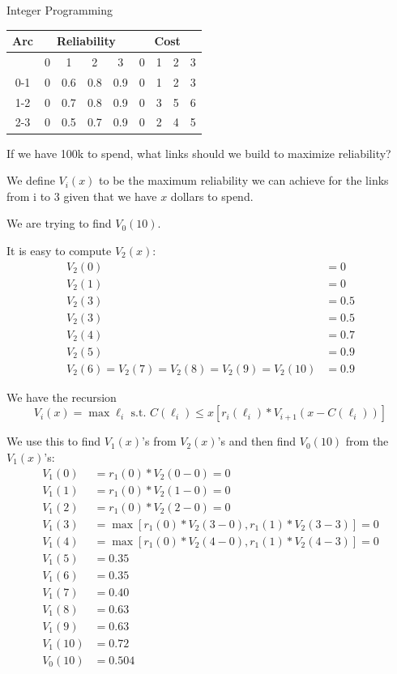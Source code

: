 \documentclass{article}
\begin{document}
\begin{section}{Integer Programming}
\begin{eg}
    \begin{tabular}{c | c | c | c | c | c | c | c | c }
        Arc & \multicolumn{4}{|c}{Reliability} & \multicolumn{4}{|c}{Cost} \\
        \hline
         & 0 & 1 & 2 & 3 & 0 & 1 & 2 & 3 \\
        0-1 & 0 & 0.6 & 0.8 & 0.9 & 0 & 1 & 2 & 3 \\
        1-2 & 0 & 0.7 & 0.8 & 0.9 & 0 & 3 & 5 & 6 \\
        2-3 & 0 & 0.5 & 0.7 & 0.9 & 0 & 2 & 4 & 5 
    \end{tabular}

    If we have 100k to spend, what links should we build to maximize reliability?
\end{eg}
\begin{answer}
    We define \(V_i(x)\) to be the maximum reliability we can achieve for the links from i to 3  
    given that we have \(x\) dollars to spend. 

    We are trying to find \(V_0(10)\). 
    
    It is easy to compute \(V_2(x)\): \\
    \begin{align*}
        V_2(0)&=0 \\
        V_2(1)&=0 \\
        V_2(3)&=0.5 \\
        V_2(3)&=0.5 \\
        V_2(4)&=0.7 \\
        V_2(5)&=0.9 \\
        V_2(6)=V_2(7)=V_2(8)=V_2(9)=V_2(10)&=0.9
    \end{align*} 

    We have the recursion \\
    \[
        V_i(x)=\max{\ell_i \text{ s.t. } C(\ell _i)\leq x} [r_i(\ell _i)*V_{i+1}(x-C(\ell _i))]
    \]

    We use this to find \(V_1(x)\)'s from \(V_2(x)\)'s and then find \(V_0(10)\) from 
    the \(V_1(x)\)'s:
    \begin{align*}
        V_1(0)&=r_1(0)*V_2(0-0)=0 \\
        V_1(1)&=r_1(0)*V_2(1-0)=0 \\
        V_1(2)&=r_1(0)*V_2(2-0)=0 \\
        V_1(3)&=\max [r_1(0)*V_2(3-0), r_1(1)*V_2(3-3)]=0 \\
        V_1(4)&=\max [r_1(0)*V_2(4-0), r_1(1)*V_2(4-3)]=0 \\
        V_1(5)&=0.35 \\
        V_1(6)&=0.35 \\
        V_1(7)&=0.40 \\
        V_1(8)&=0.63 \\
        V_1(9)&=0.63 \\
        V_1(10)&=0.72 \\
        V_0(10)&=0.504
    \end{align*}


\end{answer}
\end{section}
\end{document}
